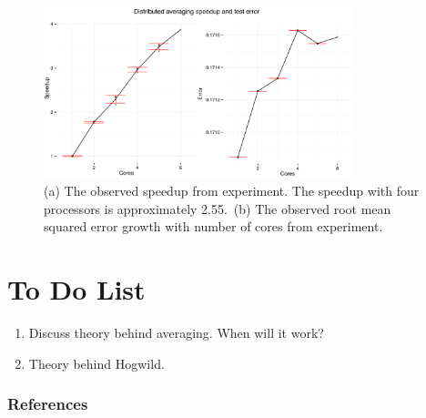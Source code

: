 \documentclass{article} %
\begin{document}
\begin{figure}[htb]
\centering
\includegraphics[width=0.8\textwidth]{../../dist_avg}
\caption{(a) The observed speedup from experiment. The speedup with four processors is approximately 2.55.~(b) The observed root mean squared error growth with number of cores from experiment.}
\label{res}
\end{figure}

\section{To Do List}
\begin{enumerate}
\item Discuss theory behind averaging. When will it work?
\item Theory behind Hogwild.
\end{enumerate}


\subsubsection*{References}

\begingroup
\renewcommand{\section}[2]{}%


\endgroup
\end{document}

